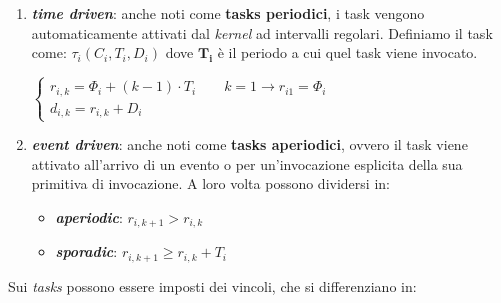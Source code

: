 \begin{enumerate}
    \item \textbf{\textit{time driven}}: anche noti come \textbf{tasks periodici}, i task vengono automaticamente attivati dal \textit{kernel} ad intervalli regolari. Definiamo il task come: $\tau_i(C_i, T_i, D_i)$ dove $\mathbf{T_i}$ è il periodo a cui quel task viene invocato.
    \begin{center}
        \begin{math}
            \begin{cases}
                r_{i,k} = \Phi_i + (k-1) \cdot T_i \qquad k = 1 \rightarrow r_{i1}= \Phi_i \\
                d_{i,k} = r_{i,k} + D_i
            \end{cases}
        \end{math}
    \end{center}

    \item \textbf{\textit{event driven}}: anche noti come \textbf{tasks aperiodici}, ovvero il task viene attivato all'arrivo di un evento o per un'invocazione esplicita della sua primitiva di invocazione. A loro volta possono dividersi in:
    \begin{itemize}
        \item \textbf{\textit{aperiodic}}: $r_{i, k+1} > r_{i, k}$
        \item \textbf{\textit{sporadic}}: $r_{i, k+1} \geq r_{i, k} + T_i$
    \end{itemize}
\end{enumerate}
Sui \textit{tasks} possono essere imposti dei vincoli, che si differenziano in:

